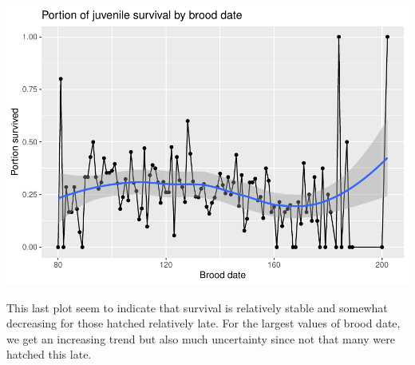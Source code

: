 \documentclass[
]{article}
\begin{document}
\includegraphics{EDA_files/figure-latex/unnamed-chunk-11-1.pdf}

This last plot seem to indicate that survival is relatively stable and
somewhat decreasing for those hatched relatively late. For the largest
values of brood date, we get an increasing trend but also much
uncertainty since not that many were hatched this late.
\end{document}

